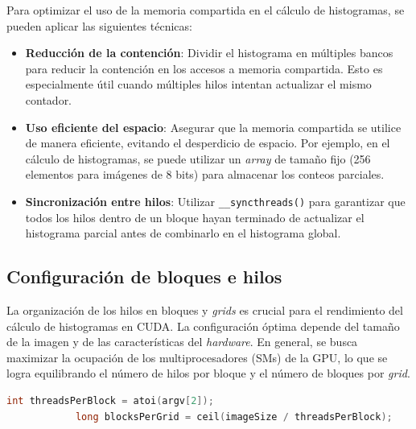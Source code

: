             Para optimizar el uso de la memoria compartida en el cálculo de histogramas, se pueden aplicar las siguientes técnicas:
            
            \begin{itemize}
            
                \item \textbf{Reducción de la contención}: Dividir el histograma en múltiples bancos para reducir la contención en los accesos a memoria compartida. Esto es especialmente útil cuando múltiples hilos intentan actualizar el mismo contador.
                
                \item \textbf{Uso eficiente del espacio}: Asegurar que la memoria compartida se utilice de manera eficiente, evitando el desperdicio de espacio. Por ejemplo, en el cálculo de histogramas, se puede utilizar un \textit{array} de tamaño fijo (256 elementos para imágenes de 8 bits) para almacenar los conteos parciales.
              
                \item \textbf{Sincronización entre hilos}: Utilizar \texttt{\_\_syncthreads()} para garantizar que todos los hilos dentro de un bloque hayan terminado de actualizar el histograma parcial antes de combinarlo en el histograma global.
            
            \end{itemize}

    \subsection{Configuración de bloques e hilos}
    
        La organización de los hilos en bloques y \textit{grids} es crucial para el rendimiento del cálculo de histogramas en CUDA. La configuración óptima depende del tamaño de la imagen y de las características del \textit{hardware}. En general, se busca maximizar la ocupación de los multiprocesadores (SMs) de la GPU, lo que se logra equilibrando el número de hilos por bloque y el número de bloques por \textit{grid}.
        
        \begin{lstlisting}[language=C, caption={Calculo de dimensiones de bloques y \textit{grid}.}, gobble=12]
            int threadsPerBlock = atoi(argv[2]);
            long blocksPerGrid = ceil(imageSize / threadsPerBlock);
        \end{lstlisting}
                
